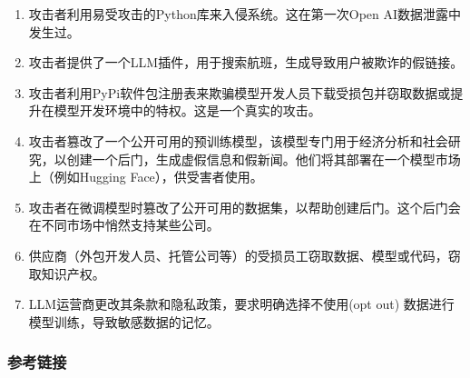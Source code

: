 \documentclass[
]{article}
\providecommand{\tightlist}{%
  \setlength{\itemsep}{0pt}\setlength{\parskip}{0pt}}
\begin{document}
\begin{enumerate}
\def\labelenumi{\arabic{enumi}.}
\tightlist
\item
  攻击者利用易受攻击的Python库来入侵系统。这在第一次Open
  AI数据泄露中发生过。
\item
  攻击者提供了一个LLM插件，用于搜索航班，生成导致用户被欺诈的假链接。
\item
  攻击者利用PyPi软件包注册表来欺骗模型开发人员下载受损包并窃取数据或提升在模型开发环境中的特权。这是一个真实的攻击。
\item
  攻击者篡改了一个公开可用的预训练模型，该模型专门用于经济分析和社会研究，以创建一个后门，生成虚假信息和假新闻。他们将其部署在一个模型市场上（例如Hugging
  Face），供受害者使用。
\item
  攻击者在微调模型时篡改了公开可用的数据集，以帮助创建后门。这个后门会在不同市场中悄然支持某些公司。
\item
  供应商（外包开发人员、托管公司等）的受损员工窃取数据、模型或代码，窃取知识产权。
\item
  LLM运营商更改其条款和隐私政策，要求明确选择不使用(opt out)
  数据进行模型训练，导致敏感数据的记忆。
\end{enumerate}

\subsubsection{参考链接}\label{ux53c2ux8003ux94feux63a5}
\end{document}
